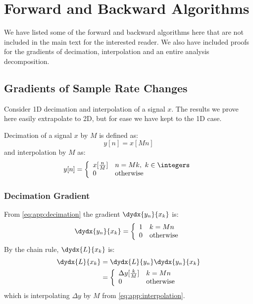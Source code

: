 \chapter{Forward and Backward Algorithms} \label{app:ch3:fwd_bwd}
\def \path {dtcwt_scat/}
\def \imgpath {dtcwt_scat/images}
We have listed some of the forward and backward algorithms here that are not
included in the main text for the interested reader. We also have included 
proofs for the gradients of decimation, interpolation and an entire analysis
decomposition.

\section{Gradients of Sample Rate Changes}\label{sec:app:samplegrads}
Consider 1D decimation and interpolation of a signal $x$. The results we prove
here easily extrapolate to 2D, but for ease we have kept to the 1D case. 

Decimation of a signal $x$ by $M$ is defined as:
\begin{equation}
  y[n] = x[Mn] \label{eq:app:decimation}
\end{equation}
and interpolation by $M$ as:
\begin{equation}
  y[n] = \left\{ \begin{array}{ll}
    x[\frac{n}{M}] & n = Mk,\ k\in \integers \\
    0 & \text{otherwise} \\ 
  \end{array}\right.
  \label{eq:app:interpolation}
\end{equation}

\subsection{Decimation Gradient}
From \eqref{eq:app:decimation} the gradient $\dydx{y_n}{x_k}$ is: 
\begin{equation}
  \dydx{y_n}{x_k} = \left\{ \begin{array}{ll}
    1 & k = Mn \\
    0 & \text{otherwise} \\
  \end{array} \right.
\end{equation}
By the chain rule, $\dydx{L}{x_k}$ is:
\begin{align}
  \dydx{L}{x_k} &= \dydx{L}{y_n}\dydx{y_n}{x_k} \\
                &= \left\{ \begin{array}{ll} 
                \Delta y[\frac{k}{M}] & k = Mn\\
                  0 & \text{otherwise} \\
                \end{array}\right.
\end{align}
which is interpolating $\Delta y$ by $M$ from \eqref{eq:app:interpolation}.


